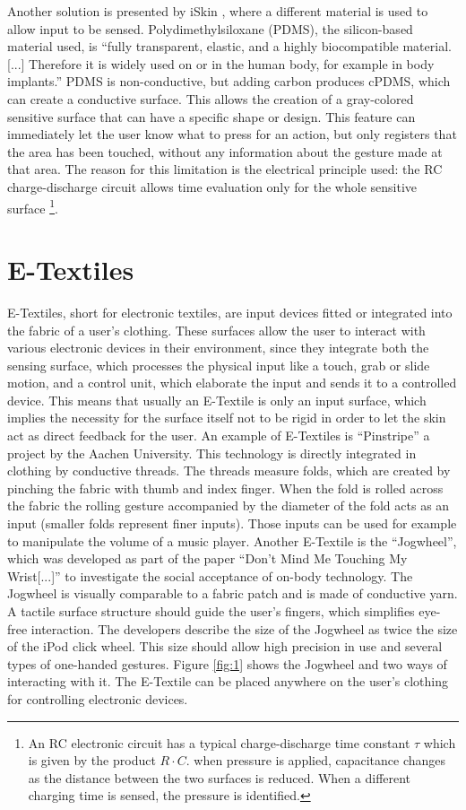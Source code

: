 \documentclass{sigchi}
\begin{document}
Another solution is presented by iSkin \cite{iSkin}, where a different material is used to allow input to be sensed.  Polydimethylsiloxane (PDMS), the silicon-based material used, is “fully transparent, elastic, and a highly biocompatible material. [...] Therefore it is widely used on or in the human body, for example in body implants.” \cite[p. 2994]{iSkin} PDMS is non-conductive, but adding carbon produces cPDMS, which can create a conductive surface. This allows the creation of a gray-colored sensitive surface that can have a specific shape or design. This feature can immediately let the user know what to press for an action, but only registers that the area has been touched, without any information about the gesture made at that area. The reason for this limitation is the electrical principle used: the RC charge-discharge circuit allows time evaluation only for the whole sensitive surface \footnote{An RC electronic circuit has a typical charge-discharge time constant $\tau$ which is given by the product $R \cdot C$. when pressure is applied, capacitance changes as the distance between the two surfaces is reduced. When a different charging time is sensed, the pressure is identified.}.

\section{E-Textiles}
E-Textiles, short for electronic textiles, are input devices fitted or integrated into the fabric of a user's clothing. These surfaces allow the user to interact with various electronic devices in their environment, since they integrate both the sensing surface, which processes the physical input like a touch, grab or slide motion,  and a control unit, which elaborate the input and sends it to a controlled device. This means that usually an E-Textile is only an input surface, which implies the necessity for the surface itself not to be rigid in order to let the skin act as direct feedback for the user.
An example of E-Textiles is ``Pinstripe'' a project by the Aachen University\cite{pinstripe}. This technology is directly integrated in clothing by conductive threads. The threads measure folds, which are created by pinching the fabric with thumb and index finger. When the fold is rolled across the fabric the rolling gesture accompanied by the diameter of the fold acts as an input (smaller folds represent finer inputs). Those inputs can be used for example to manipulate the volume of a music player. %
Another E-Textile is the ``Jogwheel'', which was developed as part of the paper ``Don't Mind Me Touching My Wrist[...]'' \cite{touch-wrist} to investigate the social acceptance of on-body technology. The Jogwheel is visually comparable to a fabric patch and is made of conductive yarn. A tactile surface structure should guide the user's fingers, which simplifies eye-free interaction. The developers describe the size of the Jogwheel as twice the size of the iPod click wheel. This size should allow high precision in use and several types of one-handed gestures.
Figure \ref{fig:1} shows the Jogwheel and two ways of interacting with it. The E-Textile can be placed anywhere on the user's clothing for controlling electronic devices. \cite{touch-wrist}
\end{document}
